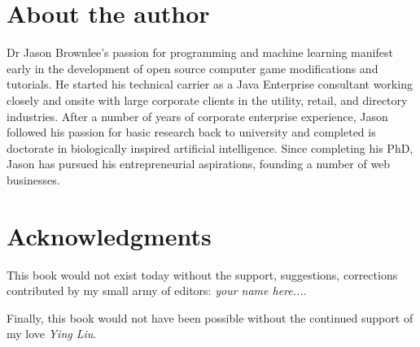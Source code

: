 \section*{About the author}
Dr Jason Brownlee's passion for programming and machine learning manifest early in the development of open source computer game modifications and tutorials. He started his technical carrier as a Java Enterprise consultant working closely and onsite with large corporate clients in the utility, retail, and directory industries. After a number of years of corporate enterprise experience, Jason followed his passion for basic research back to university and completed is doctorate in biologically inspired artificial intelligence. Since completing his PhD, Jason has pursued his entrepreneurial aspirations, founding a number of web businesses.

\section*{Acknowledgments}
This book would not exist today without the support, suggestions, corrections contributed by my small army of editors: \textit{your name here...}. 

Finally, this book would not have been possible without the continued support of my love \textit{Ying Liu}. 
